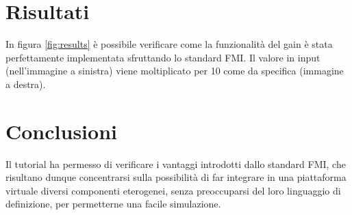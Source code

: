 \documentclass[]{IEEEtran}
\begin{document}
\section{Risultati}
In figura \ref{fig:results} \`e possibile verificare come la funzionalit\`a del gain \`e stata perfettamente implementata
sfruttando lo standard FMI. Il valore in input (nell'immagine a sinistra) viene moltiplicato per 10 come da specifica 
(immagine a destra).

\section{Conclusioni}
Il tutorial ha permesso di verificare i vantaggi introdotti dallo standard FMI, che risultano dunque concentrarsi sulla
possibilit\`a di far integrare in una piattaforma virtuale diversi componenti eterogenei, senza preoccuparsi del loro
linguaggio di definizione, per permetterne una facile simulazione.



\end{document}
